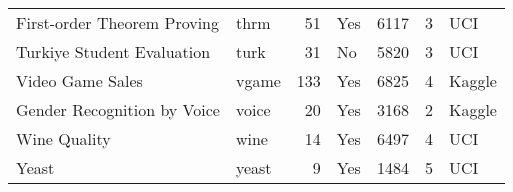 \begin{tabular}{llrlrrl}
                       First-order Theorem Proving &    thrm &   51 &             Yes &   6117 &  3 &    UCI \\
                        Turkiye Student Evaluation &    turk &   31 &              No &   5820 &  3 &    UCI \\
                                  Video Game Sales &   vgame &  133 &             Yes &   6825 &  4 & Kaggle \\
                       Gender Recognition by Voice &   voice &   20 &             Yes &   3168 &  2 & Kaggle \\
                                      Wine Quality &    wine &   14 &             Yes &   6497 &  4 &    UCI \\
                                             Yeast &   yeast &    9 &             Yes &   1484 &  5 &    UCI \\
\bottomrule
\end{tabular}
